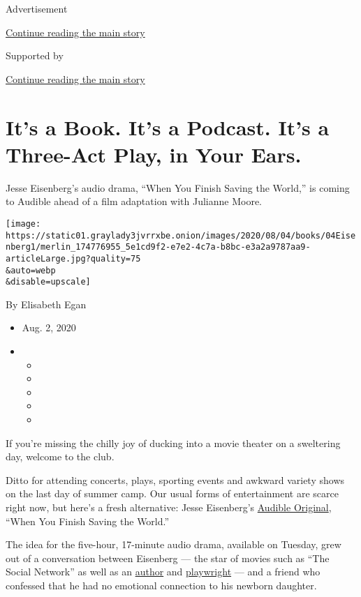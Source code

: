 Advertisement

\protect\hyperlink{after-top}{Continue reading the main story}

Supported by

\protect\hyperlink{after-sponsor}{Continue reading the main story}

\hypertarget{its-a-book-its-a-podcast-its-a-three-act-play-in-your-ears}{%
\section{It's a Book. It's a Podcast. It's a Three-Act Play, in Your
Ears.}\label{its-a-book-its-a-podcast-its-a-three-act-play-in-your-ears}}

Jesse Eisenberg's audio drama, ``When You Finish Saving the World,'' is
coming to Audible ahead of a film adaptation with Julianne Moore.

\texttt{[image: https://static01.graylady3jvrrxbe.onion/images/2020/08/04/books/04Eisenberg1/merlin\_174776955\_5e1cd9f2-e7e2-4c7a-b8bc-e3a2a9787aa9-articleLarge.jpg?quality=75\\\&auto=webp\\\&disable=upscale]}

By Elisabeth Egan

\begin{itemize}
\item
  Aug. 2, 2020
\item
  \begin{itemize}
  \item
  \item
  \item
  \item
  \item
  \end{itemize}
\end{itemize}

If you're missing the chilly joy of ducking into a movie theater on a
sweltering day, welcome to the club.

Ditto for attending concerts, plays, sporting events and awkward variety
shows on the last day of summer camp. Our usual forms of entertainment
are scarce right now, but here's a fresh alternative: Jesse Eisenberg's
\href{https://www.nytimes3xbfgragh.onion/2018/12/06/books/curtis-sittenfeld-audible-original.html}{Audible
Original}, ``When You Finish Saving the World.''

The idea for the five-hour, 17-minute audio drama, available on Tuesday,
grew out of a conversation between Eisenberg --- the star of movies such
as ``The Social Network'' as well as an
\href{https://www.nytimes3xbfgragh.onion/2015/09/06/books/review/jesse-eisenberg-by-the-book.html}{author}
and
\href{https://www.nytimes3xbfgragh.onion/2015/06/03/theater/review-the-spoils-stars-jesse-eisenberg-as-narcissist.html}{playwright}
--- and a friend who confessed that he had no emotional connection to
his newborn daughter.


